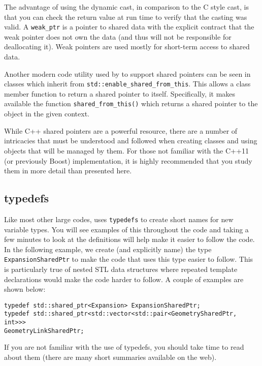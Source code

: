The advantage of using the dynamic cast, in comparison to the C style
cast, is that you can check the return value at run time to verify
that the casting was valid.  A \lstinline|weak_ptr| is a pointer to shared
data with the explicit contract that the weak pointer does not own
the data (and thus will not be responsible for deallocating it).
Weak pointers are used mostly for short-term access to shared data.

Another modern code utility used by {\nek} to support shared
pointers can be seen in {\nek} classes which inherit from
\lstinline|std::enable_shared_from_this|. This allows a class member function to return a shared pointer to itself. Specifically, it makes available the function \lstinline|shared_from_this()| which returns a shared pointer to the object in the given context.

While C++ shared pointers are a powerful resource, there are a
number of intricacies that must be understood and followed when
creating classes and using objects that will be managed by them.
For those not familiar with the C++11 (or previously Boost)
implementation, it is highly recommended that you study them in more
detail than presented here.
  
\subsection{typedefs}
Like most other large codes, {\nek} uses
\lstinline{typedefs} to create short names for new variable types.  You will
see examples of this throughout the code and taking a few minutes to
look at the definitions will help make it easier to follow the code.
In the following example, we create (and explicitly name) the type
\lstinline{ExpansionSharedPtr} to make the code that uses this type easier
to follow. This is particularly true of nested STL data structures where repeated template declarations would make the code harder to follow. A couple of examples are shown below:
\begin{lstlisting}
typedef std::shared_ptr<Expansion> ExpansionSharedPtr;
typedef std::shared_ptr<std::vector<std::pair<GeometrySharedPtr, int>>>
GeometryLinkSharedPtr;
\end{lstlisting}
If you are not familiar with the use of typedefs, you should take
time to read about them (there are many short summaries
available on the web).


